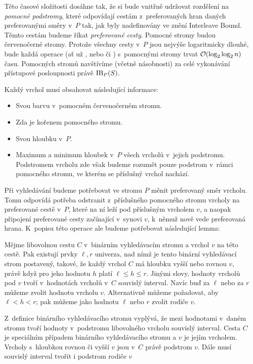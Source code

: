 Této časové složitosti dosáhne tak, že si bude vnitřně udržovat rozdělení na
\emph{pomocné podstromy}, které odpovídají cestám z~preferovaných hran daných
preferovanými směry v~$P$ tak, jak byly nadefinovány ve znění Interleave Bound.
Těmto cestám budeme říkat \emph{preferované cesty}. Pomocné stromy budou červenočerné stromy. Protože všechny cesty v~$P$
jsou nejvýše logaritmicky dlouhé, bude každá operace (ať už , nebo 
či ) s~pomocnými stromy trvat $\o(\log\log n)$ času. Pomocných stromů
navštívíme (včetně násobnosti) za celé vykonávání přístupové posloupnosti právě
$\operatorname{IB}_P(S)$.

Každý vrchol musí obsahovat následující informace:
\begin{itemize}
\item Svou barvu v~pomocném červenočerném stromu.
\item Zda je kořenem pomocného stromu.
\item Svou hloubku v~$P$.
\item Maximum a minimum hloubek v~$P$ všech vrcholů v~jejich podstromu. Podstromem vrcholu zde však budeme rozumět pouze podstrom v~rámci pomocného stromu, ve kterém se příslušný vrchol nachází.
\end{itemize}

Při vyhledávání budeme potřebovat ve stromu $P$ měnit preferovaný směr
vrcholu. Tomu odpovídá potřeba odstranit z~příslušného pomocného stromu
vrcholy na preferované cestě v~$P$, které na ní leží pod příslušným vrcholem $v$, a naopak
připojení preferované cesty začínající v~synovi $v$, k~němuž nově vede
preferovaná hrana. K~popisu této operace ale budeme potřebovat následující
lemma:

\begin{lemma}\label{lemma:interval}
Mějme libovolnou cestu $C$ v~binárním vyhledávacím stromu a vrchol $v$ na této
cestě. Pak existují prvky $\ell, r$  univerza, nad nímž je tento binární
vyhledávací strom postavený, takové, že každý vrchol $C$ má hloubku vyšší nebo
rovnou $v$, právě když pro jeho hodnotu $h$ platí $\ell \leq h \leq r$. Jinými
slovy, hodnoty vrcholů pod $v$ tvoří v~hodnotách vrcholů v~$C$ souvislý
interval. Navíc buď za $\ell$ nebo za $r$ můžeme zvolit hodnotu vrcholu $v$.
Alternativně můžeme požadovat, aby $\ell < h < r$; pak můžeme jako hodnotu
$\ell$ nebo $r$ zvolit rodiče $v$.  \end{lemma}

\begin{dukaz}
Z~definice binárního vyhledávacího stromu vyplývá, že mezi hodnotami v~daném stromu tvoří hodnoty v~podstromu libovolného vrcholu souvislý interval. Cesta $C$ je speciálním případem binárního vyhledávacího stromu a $v$ je jejím vrcholem. Vrcholy s~hloubkou rovnou či vyšší $v$ jsou v~$C$ právě podstrom $v$. Dále musí souvislý interval tvořit i podstrom rodiče $v$ 
\end{dukaz}

